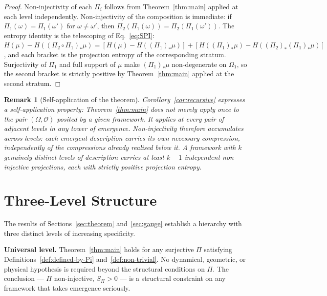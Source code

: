 \documentclass[12pt,a4paper]{article}
\newtheorem{remark}{Remark}
\begin{document}
  \begin{proof}
    Non-injectivity of each $\Pi_i$ follows from Theorem~\ref{thm:main} applied at each
    level independently.
    Non-injectivity of the composition is immediate: if $\Pi_1(\omega) = \Pi_1(\omega')$
    for $\omega \neq \omega'$, then $\Pi_2(\Pi_1(\omega)) = \Pi_2(\Pi_1(\omega'))$.
    The entropy identity is the telescoping of Eq.~\eqref{eq:SPI}:
    $H(\mu) - H((\Pi_2 \circ \Pi_1)_*\mu)
    = \left[H(\mu) - H((\Pi_1)_*\mu)\right] + \left[H((\Pi_1)_*\mu) - H((\Pi_2)_*(\Pi_1)_*\mu)\right]$,
    and each bracket is the projection entropy of the corresponding stratum.
    Surjectivity of $\Pi_1$ and full support of $\mu$ make $(\Pi_1)_*\mu$ non-degenerate on $\Omega_1$, so the
    second bracket is strictly positive by Theorem~\ref{thm:main} applied at the second stratum.
  \end{proof}

  \begin{remark}[Self-application of the theorem]
    \label{rem:self-application}
    Corollary~\ref{cor:recursive} expresses a self-application property:
    Theorem~\ref{thm:main} does not merely apply once to the pair $(\Omega, \mathcal{O})$
    posited by a given framework.
    It applies at every pair of adjacent levels in any tower of emergence.
    Non-injectivity therefore accumulates across levels: each emergent description carries its
    own necessary compression, independently of the compressions already realised below it.
    A framework with $k$ genuinely distinct levels of description carries at least $k-1$
    independent non-injective projections, each with strictly positive projection entropy.
  \end{remark}

  \section{Three-Level Structure}
  \label{sec:levels}

  The results of Sections~\ref{sec:theorem} and~\ref{sec:gauge} establish a
  hierarchy with three distinct levels of increasing specificity.

  \textbf{Universal level.}
  Theorem~\ref{thm:main} holds for any surjective $\Pi$ satisfying
  Definitions~\ref{def:defined-by-Pi} and~\ref{def:non-trivial}.
  No dynamical, geometric, or physical hypothesis is required beyond the
  structural conditions on $\Pi$.
  The conclusion --- $\Pi$ non-injective, $S_\Pi > 0$ --- is a structural
  constraint on any framework that takes emergence seriously.
\end{document}
